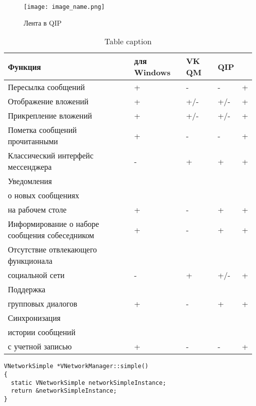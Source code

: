 \begin{figure}[hb!] \centering \texttt{[image: image\_name.png]}
	\caption{Лента в QIP}
	\label{fig:label_name}
\end{figure}

\begin{table}[h] \caption{Table caption}
\label{table:label_name}
\centering
     \begin{tabular}{ | >{\centering}m{} 
					  | >{\centering}m{} 
					  | >{\centering}m{} 
					  | >{\centering}m{}
					  | >{\centering\arraybackslash}m{}|}
	\hline Функция & \vk{} для Windows & VK QM & QIP & \textbf{\vkapp{}}\\
  	\hline Пересылка сообщений & + & - & - & +\\
  	\hline Отображение вложений & + & +/- & +/- & +\\
  	\hline Прикрепление вложений & + & +/- & +/- & +\\
  	\hline Пометка сообщений прочитанными & + & - & - & +\\
  	\hline Классический интерфейс мессенджера & - & + & + & +\\
  	\hline Уведомления \\ о новых сообщениях \\ на рабочем столе  & + & - & + &
  	+\\
  	\hline Информирование о наборе сообщения собеседником & + & - & + & +\\
  	\hline Отсутствие отвлекающего функционала \\ социальной сети & - & + & +/- &
  	+
  	\\
  	\hline Поддержка \\ групповых диалогов & + & - & + & + \\
  	\hline Синхронизация \\ истории сообщений \\ с учетной записью & + & - & - &
  	+
  	\\
  	\hline
  \end{tabular}
\end{table}


\begin{lstlisting}[style = cstyle, 
           caption = {Получение экземпляра класса VNetworkSimple},
           label = lst:vnetworksimple] 
VNetworkSimple *VNetworkManager::simple()
{
  static VNetworkSimple networkSimpleInstance;
  return &networkSimpleInstance;
}
\end{lstlisting}